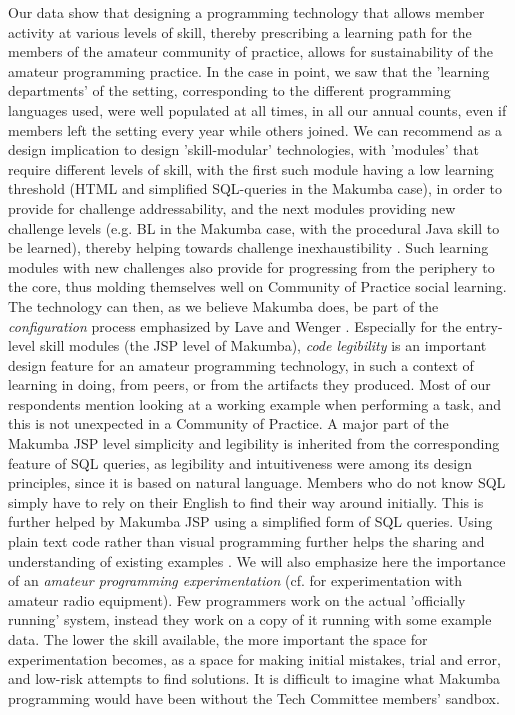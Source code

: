 \documentclass{acm_proc_article-sp}
\begin{document}
Our data show that designing a programming technology that allows member activity at various levels of skill, thereby prescribing a learning path for the members of the amateur community of practice, allows for sustainability of the amateur programming practice. In the case in point, we saw that the 'learning departments' of the setting, corresponding to the different programming languages used, were well populated at all times, in all our annual counts,  even if members left the setting every year while others joined. We can recommend as a design implication to design 'skill-modular' technologies, with 'modules' that require different levels of skill, with the first such module having a low learning threshold (HTML and simplified SQL-queries in the Makumba case), in order to provide for challenge addressability, and the next modules providing new challenge levels (e.g. BL in the Makumba case, with the procedural Java skill to be learned), thereby helping towards challenge inexhaustibility \cite{bogdan_bowers07}. Such learning modules with new challenges also provide for progressing from the periphery to the core, thus molding themselves well on Community of Practice social learning. The technology can then, as we believe Makumba does, be part of the \textit{configuration} process emphasized by Lave and Wenger \cite{lave_wenger91}. Especially for the entry-level skill modules (the JSP level of Makumba), \textit{code legibility} is an important design feature for an amateur programming technology, in such a context of learning in doing, from peers, or from the artifacts they produced. Most of our respondents mention looking at a working example when performing a task, and this is not unexpected in a Community of Practice. A major part of the Makumba JSP level simplicity and legibility is inherited from the corresponding feature of SQL queries, as legibility and intuitiveness were among its design principles, since it is based on natural language. Members who do not know SQL simply have to rely on their English to find their way around initially. This is further helped by Makumba JSP using a simplified form of SQL queries. Using plain text code rather than visual programming further helps the sharing and understanding of existing examples \cite{yamauchi00}. We will also emphasize here the importance of an \textit{amateur programming experimentation} (cf.  \cite{bogdan_bowers07} for experimentation with amateur radio equipment). Few programmers work on the actual 'officially running' system, instead they work on a copy of it running with some example data. The lower the skill available, the more important the space for experimentation becomes, as a space for making initial mistakes, trial and error, and low-risk attempts to find solutions. It is difficult to imagine what Makumba programming would have been without the Tech Committee members' sandbox.
\end{document}
